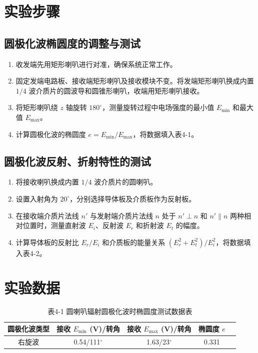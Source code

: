 \documentclass{../ElectromagneticFieldTemplate}
\begin{document}
\section{实验步骤}

\subsection{圆极化波椭圆度的调整与测试}
\begin{enumerate}
    \item 收发端先用矩形喇叭进行对准，确保系统正常工作。
    \item 固定发端电路板、接收端矩形喇叭及接收模块不变。将发端矩形喇叭换成内置 \(1/4\) 波介质片的圆波导和圆锥形喇叭，收端用矩形喇叭接收。
    \item 将矩形喇叭绕 \(z\) 轴旋转 \(180^\circ\)，测量旋转过程中电场强度的最小值 \(E_{\min}\) 和最大值 \(E_{\max}\)。
    \item 计算圆极化波的椭圆度 \(e = E_{\min}/E_{\max}\)，将数据填入表4-1。
\end{enumerate}

\subsection{圆极化波反射、折射特性的测试}
\begin{enumerate}
    \item 将接收喇叭换成内置 \(1/4\) 波介质片的圆喇叭。
    \item 设置入射角为 \(20^\circ\)，分别选择导体板及介质板作为反射板。
    \item 在接收端介质片法线 \(n'\) 与发射端介质片法线 \(n\) 处于 \(n' \perp n\) 和 \(n' \parallel n\) 两种相对位置时，测量直射波 \(E_i\)、反射波 \(E_r\) 和折射波 \(E_t\) 的幅度。
    \item 计算导体板的反射比 \(E_r/E_i\) 和介质板的能量关系 \((E_r^2 + E_t^2)/E_i^2\)，将数据填入表4-2。
\end{enumerate}

\section{实验数据}

\begin{table}[H]
    \centering
    \caption{表4-1 圆喇叭辐射圆极化波时椭圆度测试数据表}
    \renewcommand{\arraystretch}{1.3}
    \begin{tabular}{|c|c|c|c|c|}
        \hline
        圆极化波类型 &  接收 \(E_{\min}\) (V)/转角 & 接收 \(E_{\max}\) (V)/转角 & 椭圆度 \(e\) \\
        \hline
        右旋波 &  0.54/111\(^\circ\) & 1.63/23\(^\circ\) & 0.331\\
        \hline
    \end{tabular}
\end{table}
\end{document}
